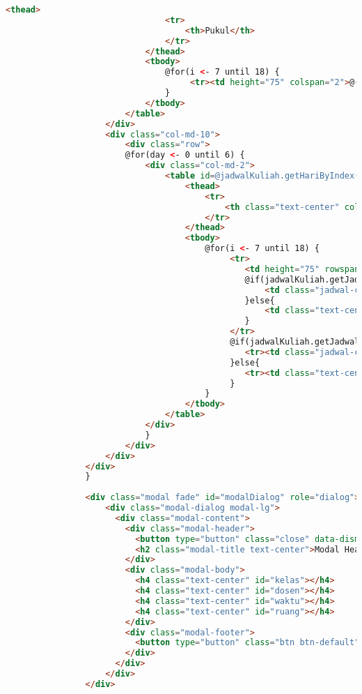 \begin{lstlisting}[language=html,basicstyle=\tiny,caption=jadwalKuliah.scala.html]
							<thead>
								<tr>
									<th>Pukul</th>
								</tr>
							</thead>
							<tbody>	
								@for(i <- 7 until 18) {
									 <tr><td height="75" colspan="2">@(i).00 </td></tr>
								}	
							</tbody>
						</table>
					</div>	
					<div class="col-md-10">
						<div class="row">
						@for(day <- 0 until 6) {
							<div class="col-md-2">
								<table id=@jadwalKuliah.getHariByIndex(day) class="table">
									<thead>
										<tr>
											<th class="text-center" colspan="2">@jadwalKuliah.getHariByIndex(day)</th>
										</tr>
									</thead>
									<tbody>	
										@for(i <- 7 until 18) {
											 <tr>
												<td height="75" rowspan="2" class="hidden-md hidden-lg">@(i).00 </td>
												@if(jadwalKuliah.getJadwalKuliah(day,(i-7)*2).getMataKuliah()!=null){	
													<td class="jadwal-cell text-center" rowspan="1" height="25" data-toggle="modal" data-target="#modalDialog" onclick="setModal('@jadwalKuliah.getJadwalKuliah(day,(i-7)*2).getMataKuliah().kode()','@jadwalKuliah.getJadwalKuliah(day,(i-7)*2).getMataKuliah().nama()','@jadwalKuliah.getJadwalKuliah(day,(i-7)*2).getKelas()','@jadwalKuliah.getJadwalKuliah(day,(i-7)*2).getDosen()','@jadwalKuliah.getJadwalKuliah(day,(i-7)*2).getWaktu()','@jadwalKuliah.getJadwalKuliah(day,(i-7)*2).getRuang()')">@(jadwalKuliah.getJadwalKuliah(day,(i-7)*2).getMataKuliah().kode())</td>
												}else{
													<td class="text-center" height="25"> - </td>
												}
											 </tr>
											 @if(jadwalKuliah.getJadwalKuliah(day,((i-7)*2)+1).getMataKuliah()!=null){	
												<tr><td class="jadwal-cell text-center" height="25" data-toggle="modal" data-target="#modalDialog" onclick="setModal('@jadwalKuliah.getJadwalKuliah(day,((i-7)*2)+1).getMataKuliah().kode()','@jadwalKuliah.getJadwalKuliah(day,((i-7)*2)+1).getMataKuliah().nama()','@jadwalKuliah.getJadwalKuliah(day,((i-7)*2)+1).getKelas()','@jadwalKuliah.getJadwalKuliah(day,((i-7)*2)+1).getDosen()','@jadwalKuliah.getJadwalKuliah(day,((i-7)*2)+1).getWaktu()','@jadwalKuliah.getJadwalKuliah(day,((i-7)*2)+1).getRuang()')">@(jadwalKuliah.getJadwalKuliah(day,((i-7)*2)+1).getMataKuliah().kode())</td></tr>
											 }else{
												<tr><td class="text-center" height="25"> - </td></tr>
											 }
										}	
									</tbody>
								</table>	
							</div>
							}	
						</div>
					</div>
				</div>
				}
				
				<div class="modal fade" id="modalDialog" role="dialog">
					<div class="modal-dialog modal-lg">
					  <div class="modal-content">
						<div class="modal-header">
						  <button type="button" class="close" data-dismiss="modal">&times;</button>
						  <h2 class="modal-title text-center">Modal Header</h2>
						</div>
						<div class="modal-body"> 
						  <h4 class="text-center" id="kelas"></h4>
						  <h4 class="text-center" id="dosen"></h4>
						  <h4 class="text-center" id="waktu"></h4>
						  <h4 class="text-center" id="ruang"></h4>
						</div>
						<div class="modal-footer">
						  <button type="button" class="btn btn-default" data-dismiss="modal">Close</button>
						</div>
					  </div>
					</div>
				</div>
				

\end{lstlisting}
